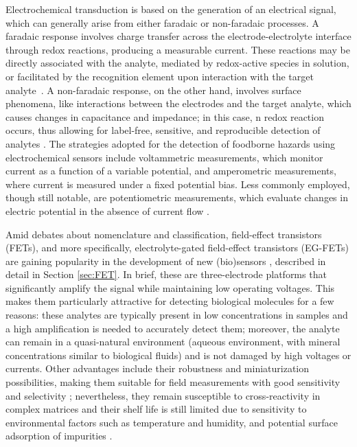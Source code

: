 Electrochemical transduction is based on the generation of an electrical signal,
which can generally arise from either faradaic or non-faradaic processes. A
faradaic response involves charge transfer across the electrode-electrolyte
interface through redox reactions, producing a measurable current. These
reactions may be directly associated with the analyte, mediated by redox-active
species in solution, or facilitated by the recognition element upon interaction
with the target analyte~\citep{adamExploring2024}. A non-faradaic response, on
the other hand, involves surface phenomena, like interactions between the
electrodes and the target analyte, which causes changes in capacitance and
impedance; in this case, n redox reaction occurs, thus allowing for label-free,
sensitive, and reproducible detection of analytes \citep{kellNonFaradaic1991}.
The strategies adopted for the detection of foodborne hazards using
electrochemical sensors include voltammetric measurements, which monitor current
as a function of a variable potential, and amperometric measurements, where
current is measured under a fixed potential bias. Less commonly employed, though
still notable, are potentiometric measurements, which evaluate changes in
electric potential in the absence of current flow \citep{hulanickiChemical1991}.

Amid debates about nomenclature and classification, field-effect transistors
(FETs), and more specifically, electrolyte-gated field-effect transistors
(EG-FETs) are gaining popularity in the development of new (bio)sensors
\citep{minamikiExtendedgate2015, nakatsukaAptamer2018,
shkodraElectrolytegated2021}, described in detail in Section \ref{sec:FET}. In
brief, these are three-electrode platforms that significantly amplify the signal
while maintaining low operating voltages. This makes them particularly
attractive for detecting biological molecules for a few reasons: these analytes
are typically present in low concentrations in samples and a high amplification
is needed to accurately detect them; moreover, the analyte can remain in a
quasi-natural environment (aqueous environment, with mineral concentrations
similar to biological fluids) and is not damaged by high voltages or currents.
Other advantages include their robustness and miniaturization possibilities,
making them suitable for field measurements with good sensitivity and
selectivity \citep{grieshaberElectrochemical2008}; nevertheless, they remain
susceptible to cross-reactivity in complex matrices and their shelf life is
still limited due to sensitivity to environmental factors such as temperature
and humidity, and potential surface adsorption of impurities
\citep{fleetElectrochemical1992, williamsElectrochemical2020}.

